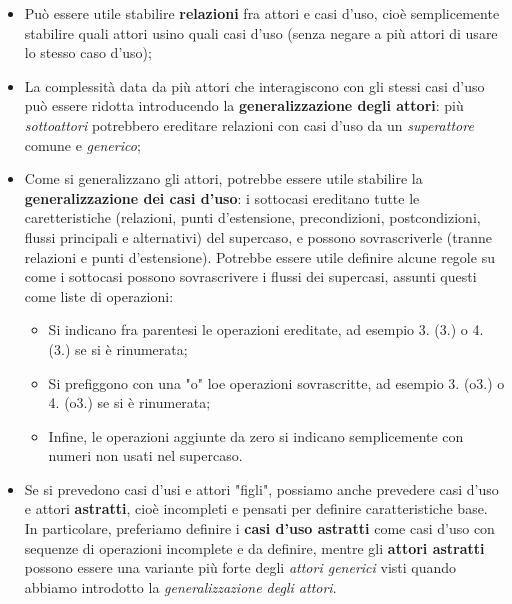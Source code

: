 \documentclass[a4paper,11pt]{article}
\begin{document}
\begin{itemize}
	\item Può essere utile stabilire \textbf{relazioni} fra attori e casi d'uso, cioè semplicemente stabilire quali attori usino quali casi d'uso (senza negare a più attori di usare lo stesso caso d'uso);
	\item La complessità data da più attori che interagiscono con gli stessi casi d'uso può essere ridotta introducendo la \textbf{generalizzazione degli attori}: più \textit{sottoattori} potrebbero ereditare relazioni con casi d'uso da un \textit{superattore} comune e \textit{generico};
	\item Come si generalizzano gli attori, potrebbe essere utile stabilire la \textbf{generalizzazione dei casi d'uso}: i sottocasi ereditano tutte le caretteristiche (relazioni, punti d'estensione, precondizioni, postcondizioni, flussi principali e alternativi) del supercaso, e possono sovrascriverle (tranne relazioni e punti d'estensione).
		Potrebbe essere utile definire alcune regole su come i sottocasi possono sovrascrivere i flussi dei supercasi, assunti questi come liste di operazioni:
		\begin{itemize}
			\item Si indicano fra parentesi le operazioni ereditate, ad esempio 3. (3.) o 4. (3.) se si è rinumerata;
			\item Si prefiggono con una "o" loe operazioni sovrascritte, ad esempio 3. (o3.) o 4. (o3.) se si è rinumerata;
			\item Infine, le operazioni aggiunte da zero si indicano semplicemente con numeri non usati nel supercaso. 
		\end{itemize}
	\item Se si prevedono casi d'usi e attori "figli", possiamo anche prevedere casi d'uso e attori \textbf{astratti}, cioè incompleti e pensati per definire caratteristiche base. In particolare, preferiamo definire i \textbf{casi d'uso astratti} come casi d'uso con sequenze di operazioni incomplete e da definire, mentre gli \textbf{attori astratti} possono essere una variante più forte degli \textit{attori generici} visti quando abbiamo introdotto la \textit{generalizzazione degli attori}. 
\end{itemize}
\end{document}
